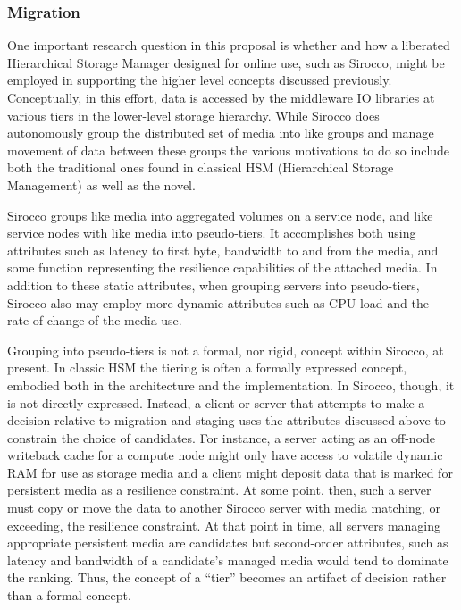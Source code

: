 \subsubsection{Migration}

One important research question in this proposal is whether and how a liberated
Hierarchical Storage Manager designed for online use, such as Sirocco, might be
employed in supporting the higher level concepts discussed previously.
Conceptually, in this effort, data is accessed by the middleware IO libraries
at various tiers in the lower-level storage hierarchy. While Sirocco does
autonomously group the distributed set of media into like groups and manage
movement of data between these groups the various motivations to do so include
both the traditional ones found in classical HSM (Hierarchical Storage
Management) as well as the novel.

Sirocco groups like media into aggregated volumes on a service node, and like
service nodes with like media into pseudo-tiers. It accomplishes both using
attributes such as latency to first byte, bandwidth to and from the media, and
some function representing the resilience capabilities of the attached media.
In addition to these static attributes, when grouping servers into
pseudo-tiers, Sirocco also may employ more dynamic attributes such as CPU load
and the rate-of-change of the media use.

Grouping into pseudo-tiers is not a formal, nor rigid, concept within Sirocco,
at present. In classic HSM the tiering is often a formally expressed concept,
embodied both in the architecture and the implementation. In Sirocco, though,
it is not directly expressed. Instead, a client or server that attempts to make
a decision relative to migration and staging uses the attributes discussed
above to constrain the choice of candidates. For instance, a server acting as
an off-node writeback cache for a compute node might only have access to
volatile dynamic RAM for use as storage media and a client might deposit data
that is marked for persistent media as a resilience constraint. At some point,
then, such a server must copy or move the data to another Sirocco server with
media matching, or exceeding, the resilience constraint. At that point in time,
all servers managing appropriate persistent media are candidates but
second-order attributes, such as latency and bandwidth of a candidate's managed
media would tend to dominate the ranking. Thus, the concept of a ``tier''
becomes an artifact of decision rather than a formal concept.

